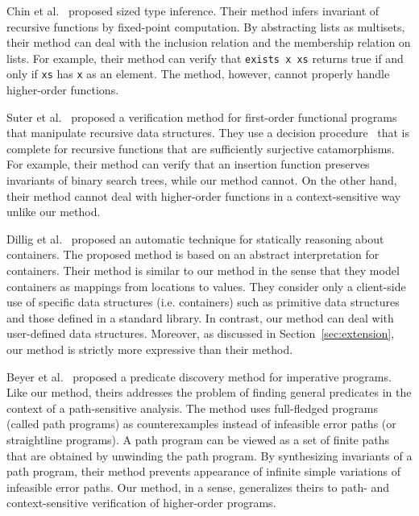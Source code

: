Chin et al.~\cite{Chin2003} proposed sized type inference.  Their method 
infers invariant of recursive functions by fixed-point computation. By 
abstracting lists as multisets, their method can deal with the inclusion 
relation and the membership relation on lists.  For example, their 
method can verify that \texttt{exists x xs} returns true if and only if 
\texttt{xs} has \texttt{x} as an element.  The method, however, cannot 
properly handle higher-order functions.

Suter et al.~\cite{Suter2011} proposed a verification method for 
first-order functional programs that manipulate recursive data 
structures.  They use a decision procedure~\cite{Suter2010} that is 
complete for recursive functions that are sufficiently surjective 
catamorphisms.  For example, their method can verify that an insertion 
function preserves invariants of binary search trees, while our method 
cannot.  On the other hand, their method cannot deal with higher-order 
functions in a context-sensitive way unlike our method.

Dillig et al.~\cite{Dillig2011} proposed an automatic technique for
statically reasoning about containers.  The proposed method is based on
an abstract interpretation for containers.  Their method is similar to
our method in the sense that they model containers as mappings from
locations to values.  They consider only a client-side use of specific
data structures (i.e. containers) such as primitive data structures and
those defined in a standard library.  In contrast, our method can deal
with user-defined data structures.  Moreover, as discussed in
Section~\ref{sec:extension}, our method is strictly more expressive than
their method.

Beyer et al.~\cite{Beyer2007} proposed a predicate discovery method for 
imperative programs.  Like our method, theirs addresses the problem of 
finding general predicates in the context of a path-sensitive analysis.  
The method uses full-fledged programs (called path programs) as 
counterexamples instead of infeasible error paths (or straightline 
programs).  A path program can be viewed as a set of finite paths that 
are obtained by unwinding the path program.  By synthesizing invariants 
of a path program, their method prevents appearance of infinite simple 
variations of infeasible error paths.  Our method, in a sense, 
generalizes theirs to path- and context-sensitive verification of 
higher-order programs.


